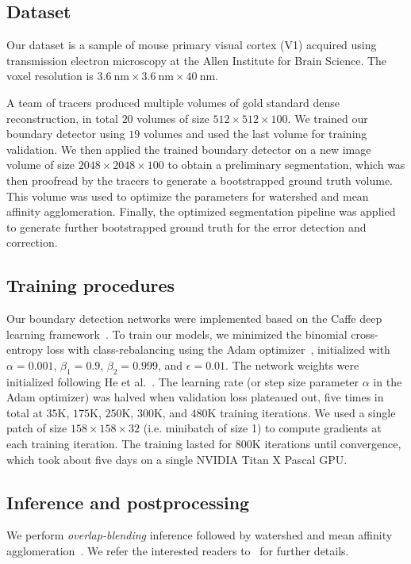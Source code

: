 \documentclass{article}
\begin{document}
\begin{appendices}
\subsection{Dataset}
Our dataset is a sample of mouse primary visual cortex (V1) acquired using
transmission electron microscopy at the Allen Institute for Brain Science. The
voxel resolution is $3.6~\text{nm} \times 3.6~\text{nm} \times 40~\text{nm}$.

A team of tracers produced multiple volumes of gold standard dense reconstruction, in total $20$ volumes of size $512 \times 512 \times 100$. We trained our boundary detector using $19$ volumes and used the last volume for training validation. We then applied the trained boundary detector on a new image volume of size $2048 \times 2048 \times 100$ to obtain a preliminary segmentation, which was then proofread by the tracers to generate a bootstrapped ground truth volume. This volume was used to optimize the parameters for watershed and mean affinity agglomeration. Finally, the optimized segmentation pipeline was applied to generate further bootstrapped ground truth for the error detection and correction.

\subsection{Training procedures}
Our boundary detection networks were implemented based on the Caffe deep
learning framework~\cite{jia2014caffe}. To train our models, we minimized the
binomial cross-entropy loss with class-rebalancing using the Adam
optimizer~\cite{adam}, initialized with $\alpha=0.001$, $\beta_1=0.9$,
$\beta_2=0.999$, and $\epsilon=0.01$. The network weights were initialized
following He et al.~\cite{he2015delving}. The learning rate (or step size
parameter $\alpha$ in the Adam optimizer) was halved when validation loss
plateaued out, five times in total at $35$K, $175$K, $250$K, $300$K, and
$480$K training iterations. We used a single patch of size
$158\times158\times32$ (i.e. minibatch of size 1) to compute gradients at each
training iteration. The training lasted for $800$K iterations until convergence,
which took about five days on a single NVIDIA Titan X Pascal GPU.

\subsection{Inference and postprocessing}
We perform \emph{overlap-blending} inference followed by watershed and mean affinity agglomeration~\cite{kisuk}. We refer the interested readers to~\cite{kisuk} for further details.


\end{appendices}
\end{document}
